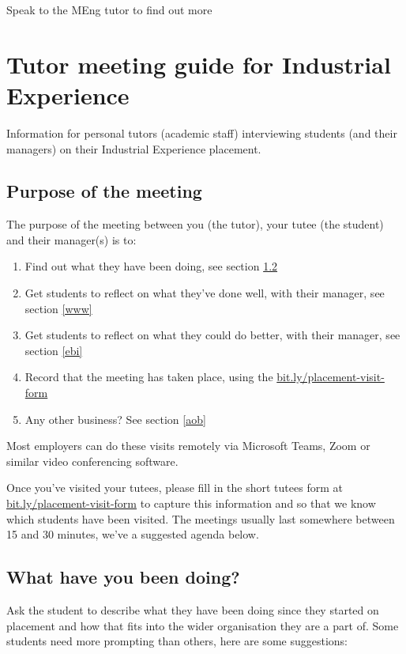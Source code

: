 \documentclass[
]{book}
\providecommand{\tightlist}{%
  \setlength{\itemsep}{0pt}\setlength{\parskip}{0pt}}
\begin{document}
Speak to the MEng tutor to find out more

\chapter{Tutor meeting guide for Industrial Experience}\label{tutors}

Information for personal tutors (academic staff) interviewing students (and their managers) on their Industrial Experience placement.

\section{Purpose of the meeting}\label{purpose}

The purpose of the meeting between you (the tutor), your tutee (the student) and their manager(s) is to:

\begin{enumerate}
\def\labelenumi{\arabic{enumi}.}
\tightlist
\item
  Find out what they have been doing, see section \ref{what}
\item
  Get students to reflect on what they've done well, with their manager, see section \ref{www}
\item
  Get students to reflect on what they could do better, with their manager, see section \ref{ebi}
\item
  Record that the meeting has taken place, using the \url{bit.ly/placement-visit-form} \citep{visitform}
\item
  Any other business? See section \ref{aob}
\end{enumerate}

Most employers can do these visits remotely via Microsoft Teams, Zoom or similar video conferencing software.

Once you've visited your tutees, please fill in the short tutees form at \url{bit.ly/placement-visit-form} \citep{visitform} to capture this information and so that we know which students have been visited. The meetings usually last somewhere between 15 and 30 minutes, we've a suggested agenda below.

\section{What have you been doing?}\label{what}

Ask the student to describe what they have been doing since they started on placement and how that fits into the wider organisation they are a part of. Some students need more prompting than others, here are some suggestions:
\end{document}
